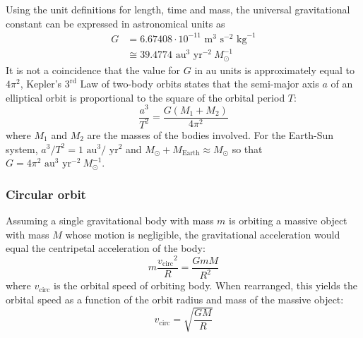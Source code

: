 \documentclass[reprint,english]{revtex4-1}
\begin{document}
Using the unit definitions for length, time and mass, the universal gravitational constant can be expressed in astronomical units as
\begin{subequations}\label{eq:G_au_units}
\begin{align}
G&=6.67408\cdot10^{-11}\text{ m}^3\text{ s}^{-2}\text{ kg}^{-1}\\
&\cong39.4774\text{ au}^3\text{ yr}^{-2}\ M_\odot^{-1}
\end{align}
\end{subequations}
It is not a coincidence that the value for \(G\) in au units is approximately equal to \(4\pi^2\), Kepler's \(3^\text{rd}\) Law of two-body orbits states that the semi-major axis \(a\) of an elliptical orbit is proportional to the square of the orbital period \(T\):
\begin{equation}\label{Kepler_3rd_law}
\frac{a^3}{T^2}=\frac{G(M_1+M_2)}{4\pi^2}
\end{equation}
where \(M_1\) and \(M_2\) are the masses of the bodies involved. For the Earth-Sun system, \(a^3/T^2=1\text{ au}^3/\text{ yr}^2\) and \(M_\odot+M_\text{Earth}\approx M_\odot\) so that \(G=4\pi^2\text{ au}^3\text{ yr}^{-2}\ M_\odot^{-1}\).
\subsubsection{Circular orbit}
Assuming a single gravitational body with mass \(m\) is orbiting a massive object with mass \(M\) whose motion is negligible, the gravitational acceleration would equal the centripetal acceleration of the body:
\[m\frac{{v_\text{circ}}^2}{R}=\frac{GmM}{R^2}\]
where \(v_\text{circ}\) is the orbital speed of orbiting body. When rearranged, this yields the orbital speed as a function of the orbit radius and mass of the massive object:
\begin{equation}\label{eq:circular_orbital_speed}
v_\text{circ}=\sqrt{\frac{GM}{R}}
\end{equation}
\end{document}
